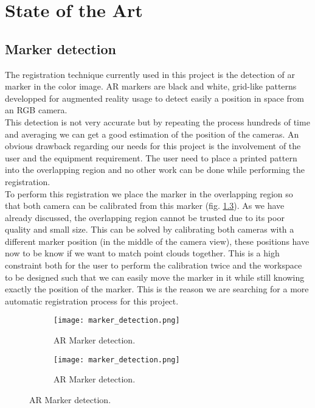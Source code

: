 
\chapter{State of the Art}


\section{Marker detection}

The registration technique currently used in this project is the detection of \acrshort{ar} marker in the color image. AR markers are black and white, grid-like patterns developped for augmented reality usage to detect easily a position in space from an RGB camera. \\
This detection is not very accurate but by repeating the process hundreds of time and averaging we can get a good estimation of the position of the cameras. An obvious drawback regarding our needs for this project is the involvement of the user and the equipment requirement. The user need to place a printed pattern into the overlapping region and no other work can be done while performing the registration. \\
To perform this registration we place the marker in the overlapping region so that both camera can be calibrated from this marker (fig. \ref{fig:ar_marker}). As we have already discussed, the overlapping region cannot be trusted due to its poor quality and small size. This can be solved by calibrating both cameras with a different marker position (in the middle of the camera view), these positions have now to be know if we want to match point clouds together. This is a high constraint both for the user to perform the calibration twice and the workspace to be designed such that we can easily move the marker in it while still knowing exactly the position of the marker. This is the reason we are searching for a more automatic registration process for this project. \\

\begin{figure}
    \centering
    \begin{subfigure}[b]{0.4}
        \texttt{[image: marker\_detection.png]}
        \caption{AR Marker detection.}
        \label{fig:marker_model}
    \end{subfigure}
\hfill
    \begin{subfigure}[b]{0.4}
        \texttt{[image: marker\_detection.png]}
        \caption{AR Marker detection.}
        \label{fig:marker_detection}
    \end{subfigure}
    \caption{AR Marker detection.}
    \label{fig:ar_marker}
\end{figure}

